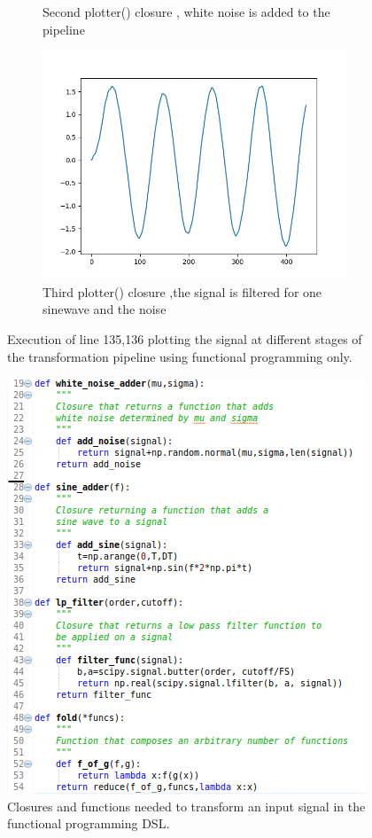 \documentclass[margin,line,a4paper,authoryear,12pt]{report}
\begin{document}
\begin{figure}[h!]
\begin{subfigure}{0.3\linewidth}
        \caption{Second plotter() closure , white noise is added to the pipeline }
        \label{fig:SonarCloud}
    \end{subfigure}
    \begin{subfigure}{0.3\linewidth}
        \centering
        \includegraphics[width=\linewidth]{func_2_sines_noise_filtered.png}
        \caption{Third plotter() closure ,the signal is filtered for one sinewave and the noise }
        \label{fig:SonarCloud}
    \end{subfigure}
    \caption{Execution of line 135,136 plotting the signal at different stages of the transformation pipeline using functional programming only.}
\end{figure}



\begin{figure}[h!]
    \centering
    \includegraphics[width=0.7\linewidth]{dsl_closures.png}
    \caption{ Closures and functions needed to transform an input signal in the functional programming DSL.}
    \label{fig:dsl_class}
\end{figure}
\end{document}

